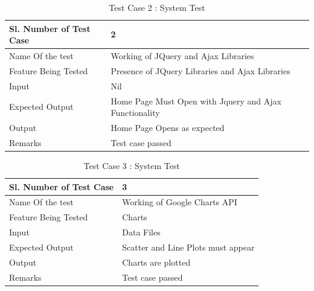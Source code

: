 \documentclass[12pt,a4paper]{report}
\begin{document}
\begin{table}
    \begin{tabular}{|l|l|}
    \hline
    Sl. Number of Test Case & 2                                                      \\ \hline
    Name Of the test        & Working of JQuery and Ajax Libraries                   \\ \hline
    Feature Being Tested    & Presence of JQuery Libraries and Ajax Libraries        \\ \hline
    Input                   & Nil                                                    \\ \hline
    Expected Output         & Home Page Must Open with Jquery and Ajax Functionality \\ \hline
    Output                  & Home Page Opens as expected                            \\ \hline
    Remarks                 & Test case passed                                       \\ \hline
    \end{tabular}
    \caption {Test Case 2 : System Test}
\end{table}





\begin{table}
    \begin{tabular}{|l|l|}
    \hline
    Sl. Number of Test Case & 3                                  \\ \hline
    Name Of the test        & Working of Google Charts API       \\ \hline
    Feature Being Tested    & Charts                             \\ \hline
    Input                   & Data Files                         \\ \hline
    Expected Output         & Scatter and Line Plots must appear \\ \hline
    Output                  & Charts are plotted                 \\ \hline
    Remarks                 & Test case passed                   \\ \hline
    \end{tabular}
    \caption {Test Case 3 : System Test}
\end{table}
\end{document}

